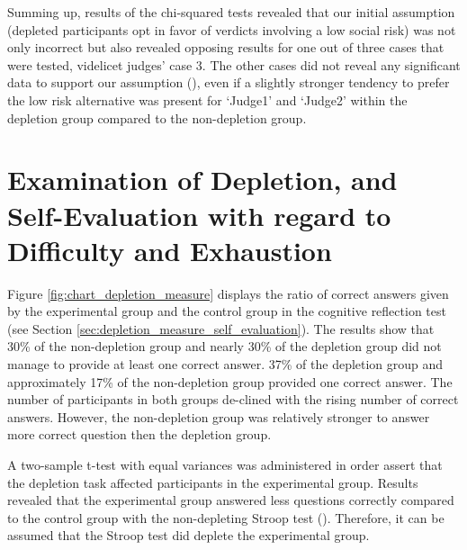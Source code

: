 Summing up, results of the chi-squared tests revealed that our initial assumption (depleted participants opt in favor of verdicts involving a low social risk) was not only incorrect but also revealed opposing results for one out of three cases that were tested, videlicet judges’ case 3. The other cases did not reveal any significant data to support our assumption (), even if a slightly stronger tendency to prefer the low risk alternative was present for ‘Judge1’ and ‘Judge2’ within the depletion group compared to the non-depletion group.\par

\FloatBarrier
\section{Examination of Depletion, and Self-Evaluation with regard to Difficulty and Exhaustion}\label{sec:depletion_measure_selfevaluation}
Figure \ref{fig:chart_depletion_measure} displays the ratio of correct answers given by the experimental group and the control group in the cognitive reflection test (see Section \ref{sec:depletion_measure_self_evaluation}). The results show that 30\% of the non-depletion group and nearly 30\% of the depletion group did not manage to provide at least one correct answer. 37\% of the depletion group and approximately 17\% of the non-depletion group provided one correct answer. The number of participants in both groups de-clined with the rising number of correct answers. However, the non-depletion group was relatively stronger to answer more correct question then the depletion group. \par
A two-sample t-test with equal variances was administered in order assert that the depletion task affected participants in the experimental group. Results revealed that the experimental group answered less questions correctly compared to the control group with the non-depleting Stroop test (). Therefore, it can be assumed that the Stroop test did deplete the experimental group. \par
